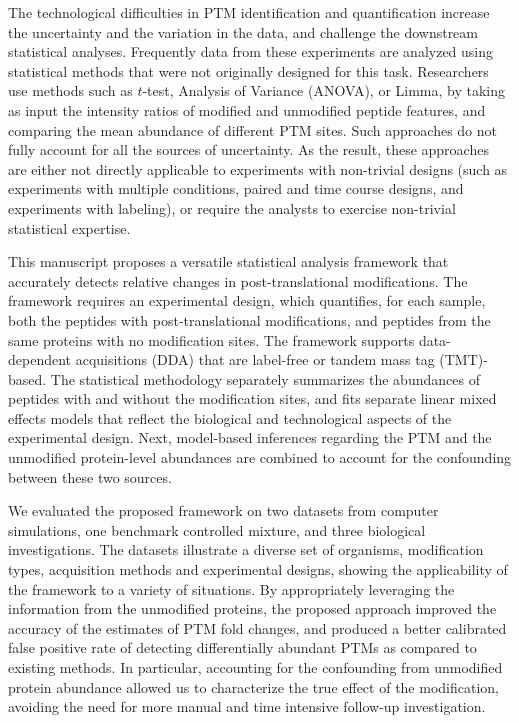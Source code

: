 \documentclass[mcp]{article}
\numberwithin{table}{section}
\begin{document}
The technological difficulties in PTM identification and quantification increase the uncertainty and the variation in the data, and challenge the downstream statistical analyses. Frequently data from these experiments are analyzed using statistical methods that were not originally designed for this task. Researchers use methods such as $t$-test\cite{Kalpic:2011}, Analysis of Variance (ANOVA)\cite{girden:1992}, or Limma\cite{Ritchie_15a}, by taking as input the intensity ratios of modified and unmodified peptide features, and comparing the mean abundance of different PTM sites. Such approaches do not fully account for all the sources of uncertainty. As the result, these approaches are either not directly applicable to experiments with non-trivial designs (such as experiments with multiple conditions, paired and time course designs, and experiments with labeling), or require the analysts to exercise non-trivial statistical expertise.

This manuscript proposes a versatile statistical analysis framework that accurately detects relative changes in post-translational modifications. The framework requires an experimental design, which quantifies, for each sample, both the peptides with post-translational modifications, and peptides from the same proteins with no modification sites. The framework supports data-dependent acquisitions (DDA) that are label-free or tandem mass tag (TMT)-based. The statistical methodology separately summarizes the abundances of peptides with and without the modification sites, and fits separate linear mixed effects models that reflect the biological and technological aspects of the experimental design. Next, model-based inferences regarding the PTM and the unmodified protein-level abundances are combined to account for the confounding between these two sources.

We evaluated the proposed framework on two datasets from computer simulations, one benchmark controlled mixture, and three biological investigations. The datasets illustrate a diverse set of organisms, modification types, acquisition methods and experimental designs, showing the applicability of the framework to a variety of situations. By appropriately leveraging the information from the unmodified proteins, the proposed approach improved the accuracy of the estimates of PTM fold changes, and produced a better calibrated false positive rate of detecting differentially abundant PTMs as compared to existing methods. In particular, accounting for the confounding from unmodified protein abundance allowed us to characterize the true effect of the modification, avoiding the need for more manual and time intensive follow-up investigation.
\end{document}
